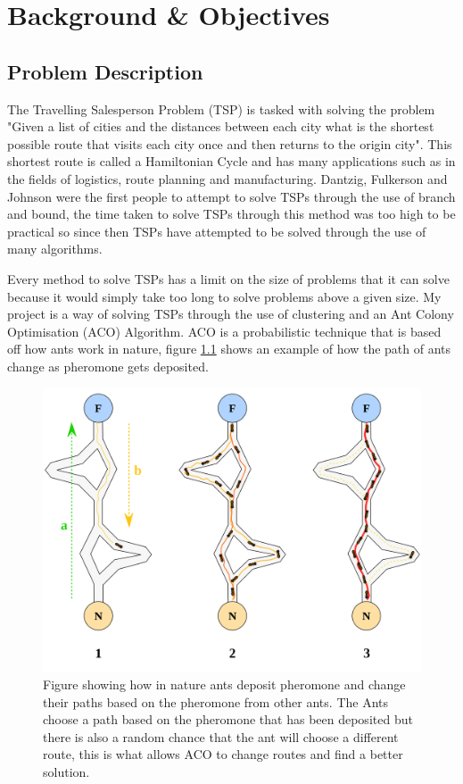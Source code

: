 \chapter{Background \& Objectives}

\section{Problem Description}

The Travelling Salesperson Problem (TSP) is tasked with solving the problem "Given a list of cities and the distances between each city what is the shortest possible route that visits each city once and then returns to the origin city". This shortest route is called a Hamiltonian Cycle and has many applications such as in the fields of logistics, route planning and manufacturing\cite{acobook}. Dantzig, Fulkerson and Johnson were the first people to attempt to solve TSPs through the use of branch and bound\cite{dantzig1954solution}, the time taken to solve TSPs through this method was too high to be practical so since then TSPs have attempted to be solved through the use of many algorithms.

Every method to solve TSPs has a limit on the size of problems that it can solve because it would simply take too long to solve problems above a given size. My project is a way of solving TSPs through the use of clustering and an Ant Colony Optimisation (ACO) Algorithm. ACO is a probabilistic technique that is based off how ants work in nature, figure \ref{fig:aco_pheremone_example} shows an example of how the path of ants change as pheromone gets deposited.

\begin{figure}
    \centering
    \includegraphics[width=\textwidth]{Project Report/LaTeX Template/figures/aco_pheremone_demo.png}
    \caption{Figure showing how in nature ants deposit pheromone and change their paths based on the pheromone from other ants. The Ants choose a path based on the pheromone that has been deposited but there is also a random chance that the ant will choose a different route, this is what allows ACO to change routes and find a better solution.}
    \label{fig:aco_pheremone_example}
\end{figure}


